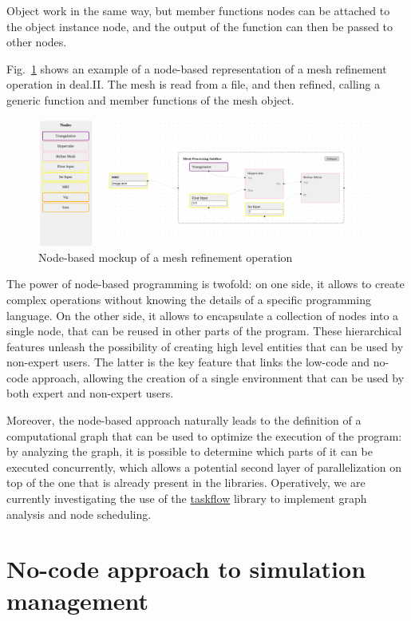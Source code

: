 \documentclass[a4paper,12pt]{article}
\begin{document}
Object work in the same way, but member functions nodes can be attached to the object instance node, and the output of the function can then be passed to other nodes.

Fig.~\ref{refine} shows an example of a node-based representation of a mesh refinement operation in deal.II. The mesh is read from a file, and then refined, calling a generic function and member functions of the mesh object.
\begin{figure}
    \includegraphics[width=400pt]{refine.png}
    \caption{Node-based mockup of a mesh refinement operation}
    \label{refine}
\end{figure}


The power of node-based programming is twofold: on one side, it allows to create complex operations without knowing the details of a specific programming language. On the other side, it allows to encapsulate a collection of nodes into a single node, that can be reused in other parts of the program. These hierarchical features unleash the possibility of creating high level entities that can be used by non-expert users. The latter is the key feature that links the low-code and no-code approach, allowing the creation of a single environment that can be used by both expert and non-expert users.

Moreover, the node-based approach naturally leads to the definition of a computational graph that can be used to optimize the execution of the program: by analyzing the graph, it is possible to determine which parts of it can be executed concurrently, which allows a potential second layer of parallelization on top of the one that is already present in the libraries. Operatively, we are currently investigating the use of the \href{https://github.com/taskflow/taskflow}{taskflow} library to implement graph analysis and node scheduling.   

\section{\textcolor{EUblue}{No-code approach to simulation management}}
\end{document}
